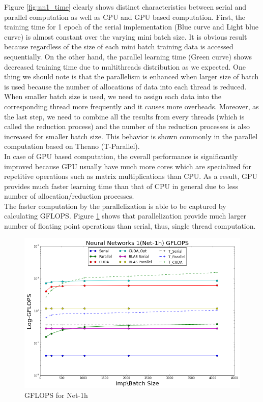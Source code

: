 Figure \ref{fig:nn1_time} clearly shows distinct characteristics between serial and parallel computation as well as CPU and GPU based computation. First, the training time for 1 epoch of the serial implementation (Blue curve and Light blue curve) is almost constant over the varying mini batch size. It is obvious result because regardless of the size of each mini batch training data is accessed sequentially. On the other hand, the parallel learning time (Green curve) shows decreased training time due to multithreads distribution as we expected. One thing we should note is that the parallelism is enhanced when larger size of batch is used because the number of allocations of data into each thread is reduced. When smaller batch size is used, we need to assign each data into the corresponding thread more frequently and it causes more overheads. Moreover, as the last step, we need to combine all the results from every threads (which is called the reduction process) and the number of the reduction processes is also increased for smaller batch size. This behavior is shown commonly in the parallel computation based on Theano (T-Parallel).\\
In case of GPU based computation, the overall performance is significantly improved because GPU usually have much more cores which are specialized for repetitive operations such as matrix multiplications than CPU. As a result, GPU provides much faster learning time than that of CPU in general due to less number of allocation/reduction processes.\\
The faster computation by the parallelization is able to be captured by calculating GFLOPS. Figure \ref{fig:nn1_gflops} shows that parallelization provide much larger number of floating point operations than serial, thus, single thread computation.
\begin{figure}[ht]
\begin{center}
\centerline{\includegraphics[width=\columnwidth]{../../slide/nn1_gflops.png}}
\caption{GFLOPS for Net-1h}
\label{fig:nn1_gflops}
\end{center}
\vskip -0.4in
\end{figure}

